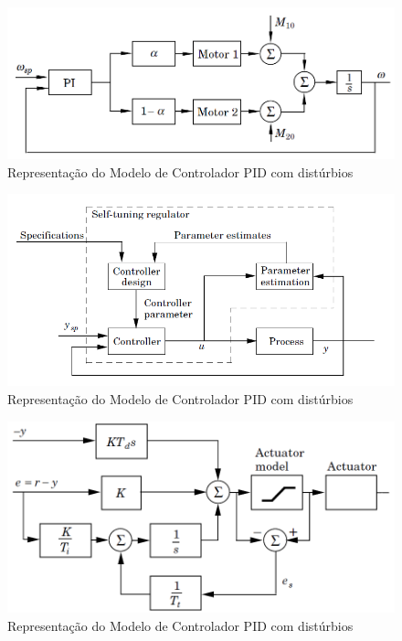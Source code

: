 \begin{figure}[htb]
  \caption{Representação do Modelo de Controlador PID com distúrbios}
  \begin{center}
      \includegraphics[scale=0.65]{img/pi_twomotors_astrom_p308}
  \end{center}
\end{figure}

\begin{figure}[htb]
  \caption{Representação do Modelo de Controlador PID com distúrbios}
  \begin{center}
      \includegraphics[scale=0.75]{img/pid_adaptative_astrom_p233}
  \end{center}
\end{figure}

\begin{figure}[htb]
  \caption{Representação do Modelo de Controlador PID com distúrbios}
  \begin{center}
      \includegraphics[scale=0.65]{img/pid_antiwindup_astrom_p83}
  \end{center}
\end{figure}

